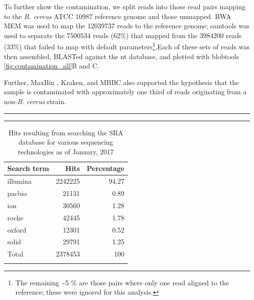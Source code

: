 \documentclass[10pt]{article}
\def \thoughtbr {\begin{center}\noindent\rule{.4\textwidth}{0.4pt}  {\raisebox{-.5ex}{$\sim$}}  \rule{.4\textwidth}{0.4pt}\end{center}}
\def \ttilde {\raisebox{-.5ex}\textasciitilde} %
\begin{document}
To further show the contamination, we split reads into those read pairs mapping to the \textit{B. cereus} ATCC 10987 reference genome and those unmapped.  BWA MEM \cite{Li2013} was used to map the 12039737 reads to the reference genome;  samtools was used to separate the 7500534 reads (62\%) that mapped from the 3984200 reads (33\%) that failed to map with default parameters\footnote{The remaining \ttilde5 \% are those pairs where only one read aligned to the reference; these were ignored for this analysis.}.Each of these sets of reads was then assembled, BLASTed against the nt database, and plotted with blobtools \ref{fig:contamination_all}B and C.


Further, MaxBin \cite{Wu2014}, Kraken, and MBBC \cite{Wang2011} also supported the hypothesis that the sample is contaminated with approximately one third of reads originating from a non-\textit{B. cereus} strain.

\thoughtbr
\newpage

\begin{table}[]
  \centering
  \caption{Hits resulting from searching the SRA database for various sequencing technologies as of January, 2017}
  \label{table:searchterms}
  \begin{tabular}{lrr}
    \toprule
    Search term & Hits & Percentage \\
    \midrule
    illumina & 2242225 & 94.27 \\
    pacbio & 21131 & 0.89 \\
    ion & 30560 & 1.28 \\
    roche & 42445 & 1.78 \\
    oxford & 12301 & 0.52 \\
    solid & 29791 & 1.25 \\
    \arrayrulecolor{lgray}\hline
    Total & 2378453 & 100\\
    \arrayrulecolor{black}
    \bottomrule
\end{tabular}
\end{table}
\end{document}
